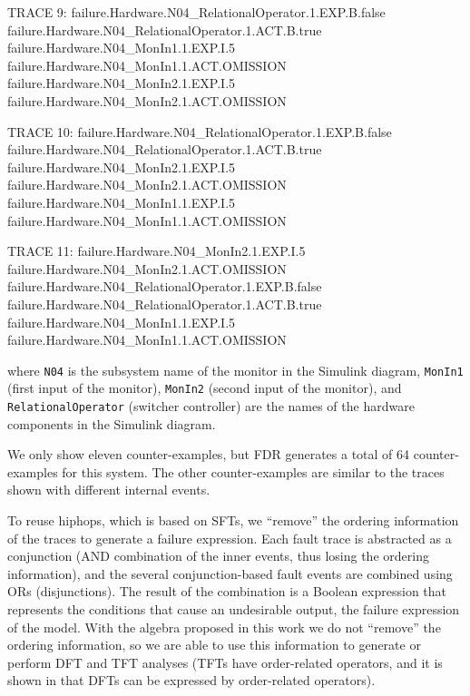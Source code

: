 \documentclass[12pt,openright,twoside,a4paper,oldfontcommands,english,brazil,final]{abntex2}
\theoremstyle{theo}
\newenvironment{snippetcspm}[1][2]
{
\ifthenelse{\equal{#1}{0}}
    {\tiny}
    {
    \ifthenelse{\equal{#1}{1}}
        {\scriptsize}
        {
        \ifthenelse{\equal{#1}{2}}
            {\footnotesize}
            {\small}
        }
    }
\verbatim
}
{
\endverbatim
}
\newcommand{\simulink}{Simulink\xspace}
\begin{document}
\begin{snippetcspm}[1]
TRACE 9:
failure.Hardware.N04_RelationalOperator.1.EXP.B.false
failure.Hardware.N04_RelationalOperator.1.ACT.B.true
failure.Hardware.N04_MonIn1.1.EXP.I.5
failure.Hardware.N04_MonIn1.1.ACT.OMISSION
failure.Hardware.N04_MonIn2.1.EXP.I.5
failure.Hardware.N04_MonIn2.1.ACT.OMISSION

TRACE 10:
failure.Hardware.N04_RelationalOperator.1.EXP.B.false
failure.Hardware.N04_RelationalOperator.1.ACT.B.true
failure.Hardware.N04_MonIn2.1.EXP.I.5
failure.Hardware.N04_MonIn2.1.ACT.OMISSION
failure.Hardware.N04_MonIn1.1.EXP.I.5
failure.Hardware.N04_MonIn1.1.ACT.OMISSION

TRACE 11:
failure.Hardware.N04_MonIn2.1.EXP.I.5
failure.Hardware.N04_MonIn2.1.ACT.OMISSION
failure.Hardware.N04_RelationalOperator.1.EXP.B.false
failure.Hardware.N04_RelationalOperator.1.ACT.B.true
failure.Hardware.N04_MonIn1.1.EXP.I.5
failure.Hardware.N04_MonIn1.1.ACT.OMISSION
\end{snippetcspm}
%
where \verb$N04$ is the subsystem name of the monitor in the \simulink diagram, \verb$MonIn1$ (first input of the monitor), \verb$MonIn2$ (second input of the monitor), and \verb$RelationalOperator$ (switcher controller) are the names of the hardware components in the \simulink diagram.

We only show eleven counter-examples, but \acs{FDR} generates a total of 64 counter-examples for this system.
The other counter-examples are similar to the traces shown with different internal events.

To reuse \ac{hiphops}, which is based on \acp{SFT}, we ``remove'' the ordering information of the traces to generate a failure expression.
Each fault trace is abstracted as a conjunction (\ac{AND} combination of the inner events, thus losing the ordering information), and the several conjunction-based fault events are combined using \acp{OR} (disjunctions).
The result of the combination is a Boolean expression that represents the conditions that cause an undesirable output, the failure expression of the model.
With the \ac{algebra} proposed in this work we do not ``remove'' the ordering information, so we are able to use this information to generate or perform \ac{DFT} and \ac{TFT} analyses (\acp{TFT} have order-related operators, and it is shown in \cite{Merle2010,MRL2011b,MRL2011} that \acp{DFT} can be expressed by order-related operators).
\end{document}
